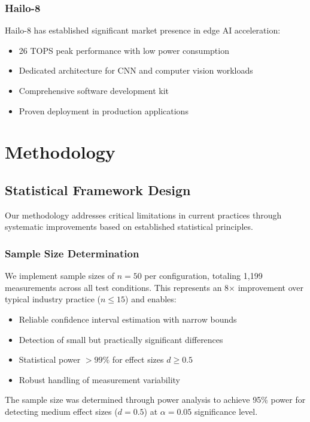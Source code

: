 \documentclass[manuscript]{acmart}
\begin{document}
\subsubsection{Hailo-8}
Hailo-8 has established significant market presence in edge AI acceleration:
\begin{itemize}
    \item 26 TOPS peak performance with low power consumption
    \item Dedicated architecture for CNN and computer vision workloads
    \item Comprehensive software development kit
    \item Proven deployment in production applications
\end{itemize}

\section{Methodology}

\subsection{Statistical Framework Design}

Our methodology addresses critical limitations in current practices through systematic improvements based on established statistical principles.

\subsubsection{Sample Size Determination}
We implement sample sizes of $n = 50$ per configuration, totaling 1,199 measurements across all test conditions. This represents an 8× improvement over typical industry practice ($n \leq 15$) and enables:

\begin{itemize}
    \item Reliable confidence interval estimation with narrow bounds
    \item Detection of small but practically significant differences
    \item Statistical power $>99\%$ for effect sizes $d \geq 0.5$
    \item Robust handling of measurement variability
\end{itemize}

The sample size was determined through power analysis to achieve 95\% power for detecting medium effect sizes ($d = 0.5$) at $\alpha = 0.05$ significance level.
\end{document}
